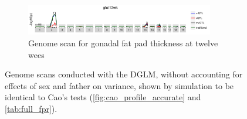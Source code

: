 \begin{figure}[h]
\begin{subfigure}{\linewidth}
      \centering
      \includegraphics[width = 0.9\textwidth]{images/scan_cao_gfat12wk.pdf}
      \caption{Genome scan for gonadal fat pad thickness at twelve wees}
      \label{fig:gfat12wk_cao_scan}
    \end{subfigure}
    \caption{
      Genome scans conducted with the DGLM, without accounting for effects of sex and father on variance, shown by simulation to be identical to Cao's tests (\autoref{fig:cao_profile_accurate} and \autoref{tab:full_fpr}).
    }
  \end{figure}
  

\FloatBarrier
\clearpage
